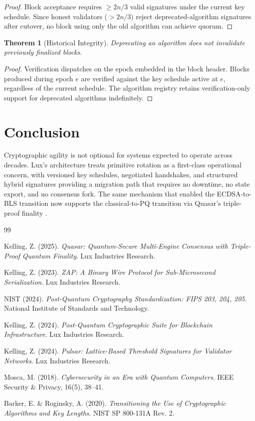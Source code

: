 \documentclass[11pt]{article}
\newtheorem{theorem}{Theorem}
\begin{document}
\begin{proof}
Block acceptance requires $\geq 2n/3$ valid signatures under the current key schedule. Since honest validators ($> 2n/3$) reject deprecated-algorithm signatures after cutover, no block using only the old algorithm can achieve quorum.
\end{proof}

\begin{theorem}[Historical Integrity]
Deprecating an algorithm does not invalidate previously finalized blocks.
\end{theorem}

\begin{proof}
Verification dispatches on the epoch embedded in the block header. Blocks produced during epoch $e$ are verified against the key schedule active at $e$, regardless of the current schedule. The algorithm registry retains verification-only support for deprecated algorithms indefinitely.
\end{proof}

\section{Conclusion}

Cryptographic agility is not optional for systems expected to operate across decades. Lux's architecture treats primitive rotation as a first-class operational concern, with versioned key schedules, negotiated handshakes, and structured hybrid signatures providing a migration path that requires no downtime, no state export, and no consensus fork. The same mechanism that enabled the ECDSA-to-BLS transition now supports the classical-to-PQ transition via Quasar's triple-proof finality \cite{quasar}.

\begin{thebibliography}{99}

Kelling, Z. (2025).
\textit{Quasar: Quantum-Secure Multi-Engine Consensus with Triple-Proof Quantum Finality}.
Lux Industries Research.

Kelling, Z. (2023).
\textit{ZAP: A Binary Wire Protocol for Sub-Microsecond Serialization}.
Lux Industries Research.

NIST (2024).
\textit{Post-Quantum Cryptography Standardization: FIPS 203, 204, 205}.
National Institute of Standards and Technology.

Kelling, Z. (2024).
\textit{Post-Quantum Cryptographic Suite for Blockchain Infrastructure}.
Lux Industries Research.

Kelling, Z. (2024).
\textit{Pulsar: Lattice-Based Threshold Signatures for Validator Networks}.
Lux Industries Research.

Mosca, M. (2018).
\textit{Cybersecurity in an Era with Quantum Computers}.
IEEE Security \& Privacy, 16(5), 38--41.

Barker, E. \& Roginsky, A. (2020).
\textit{Transitioning the Use of Cryptographic Algorithms and Key Lengths}.
NIST SP 800-131A Rev. 2.

\end{thebibliography}
\end{document}
